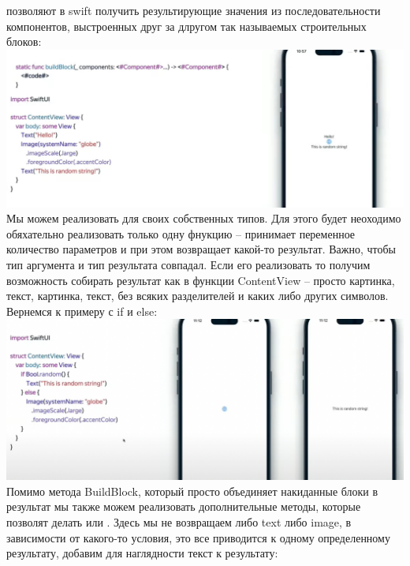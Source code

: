 \documentclass{article}
\begin{document}
    \newline
     позволяют в swift получить результирующие значения из последовательности компонентов, выстроенных друг за длругом так называемых строительных блоков:
    \newline
    \includegraphics[scale = 0.5]{pic/Снимок экрана 2023-07-28 в 23.50.29.png}
    \newline
    Мы можем реализовать  для своих собственных типов. Для этого будет неоходимо обяхательно реализовать только одну фнукцию  -- принимает переменное количество параметров и при этом возвращает какой-то результат. Важно, чтобы тип аргумента и тип результата совпадал. 
    \newline
    Если его реализовать то получим возможность собирать результат как в функции ContentView -- просто картинка, текст, картинка, текст, без всяких разделителей и каких либо других символов.
    \newline
    \newline
    Вернемся к примеру с if и else:
    \newline
    \includegraphics[scale = 0.5]{pic/Снимок экрана 2023-07-28 в 23.55.44.png}
    \newline
    Помимо метода BuildBlock, который просто объединяет накиданные блоки в результат мы также можем реализовать дополнительные методы, которые позволят делать  или . Здесь мы не возвращаем либо text либо image, в зависимости от какого-то условия, это все приводится к одному определенному результату, добавим для наглядности текст к результату: 
\end{document}
